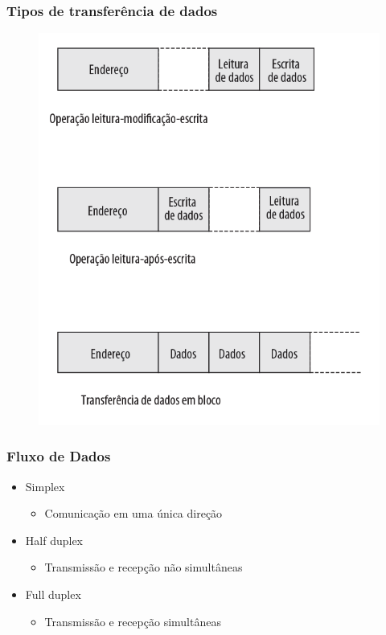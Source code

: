 \documentclass[aspectratio=169,
				xcolor=table]{beamer}
\begin{document}
	\begin{frame}
		\frametitle{Tipos de transferência de dados}
		\begin{figure}[hbtp]
		\centering
		\includegraphics[height=.85\textheight]{../figs/cap11/tipo2.png}
		\end{figure}
	\end{frame}	
	
	\begin{frame}
		\frametitle{Fluxo de Dados}
		
		\begin{itemize}
			\item Simplex
			\begin{itemize}
				\item Comunicação em uma única direção
			\end{itemize}
			\vspace{1em}
			\item Half duplex
			\begin{itemize}
				\item Transmissão e recepção não simultâneas
			\end{itemize}
			\vspace{1em}
			\item Full duplex
			\begin{itemize}
				\item Transmissão e recepção simultâneas
			\end{itemize}
		\end{itemize}
	\end{frame}
	
\end{document}
